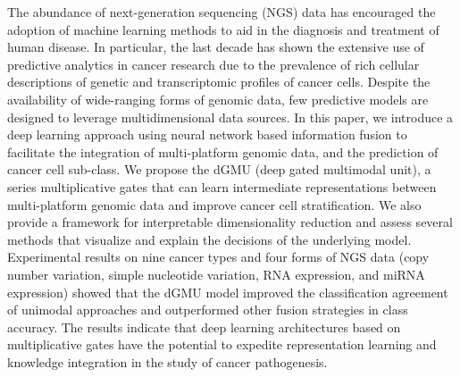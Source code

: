 

The abundance of next-generation sequencing (NGS) data has encouraged the adoption of machine learning methods to aid in the diagnosis and treatment of human disease. In particular, the last decade has shown the extensive use of predictive analytics in cancer research due to the prevalence of rich cellular descriptions of genetic and transcriptomic profiles of cancer cells. Despite the availability of wide-ranging forms of genomic data, few predictive models are designed to leverage multidimensional data sources. In this paper, we introduce a deep learning approach using neural network based information fusion to facilitate the integration of multi-platform genomic data, and the prediction of cancer cell sub-class. We propose the dGMU (deep gated multimodal unit), a series multiplicative gates that can learn intermediate representations between multi-platform genomic data and improve cancer cell stratification. We also provide a framework for interpretable dimensionality reduction and assess several methods that visualize and explain the decisions of the underlying model. Experimental results on nine cancer types and four forms of NGS data (copy number variation, simple nucleotide variation, RNA expression, and miRNA expression) showed that the dGMU model improved the classification agreement of unimodal approaches and outperformed other fusion strategies in class accuracy. The results indicate that deep learning architectures based on multiplicative gates have the potential to expedite representation learning and knowledge integration in the study of cancer pathogenesis.

